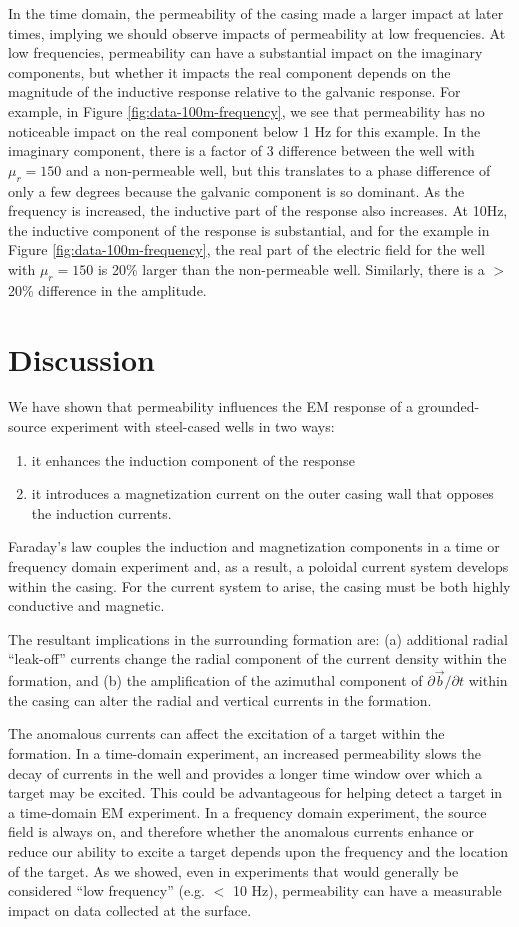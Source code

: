 In the time domain, the permeability of the casing made a larger impact at later times, implying we should observe impacts of permeability at low frequencies. At low frequencies, permeability can have a substantial impact on the imaginary components, but whether it impacts the real component depends on the magnitude of the inductive response relative to the galvanic response. For example, in Figure \ref{fig:data-100m-frequency}, we see that permeability has no noticeable impact on the real component below 1 Hz for this example. In the imaginary component, there is a factor of 3 difference between the well with $\mu_r = 150$ and a non-permeable well, but this translates to a phase difference of only a few degrees because the galvanic component is so dominant. As the frequency is increased, the inductive part of the response also increases. At 10Hz, the inductive component of the response is substantial, and for the example in Figure \ref{fig:data-100m-frequency}, the real part of the electric field for the well with $\mu_r = 150$ is 20\% larger than the non-permeable well. Similarly, there is a $>$20\% difference in the amplitude.


\section{Discussion}
We have shown that permeability influences the EM response of a grounded-source experiment with steel-cased wells in two ways:
\begin{enumerate}
\item it enhances the induction component of the response
\item it introduces a magnetization current on the outer casing wall that opposes the induction currents.
\end{enumerate}
Faraday's law couples the induction and magnetization components in a time or frequency domain experiment and, as a result, a poloidal current system develops within the casing. For the current system to arise, the casing must be both highly conductive and magnetic.

The resultant implications in the surrounding formation are: (a) additional radial ``leak-off'' currents change the radial component of the current density within the formation, and (b) the amplification of the azimuthal component of $\partial \vec{b}/\partial t$ within the casing can alter the radial and vertical currents in the formation.

The anomalous currents can affect the excitation of a target within the formation. In a time-domain experiment, an increased permeability slows the decay of currents in the well and provides a longer time window over which a target may be excited. This could be advantageous for helping detect a target in a time-domain EM experiment. In a frequency domain experiment, the source field is always on, and therefore whether the anomalous currents enhance or reduce our ability to excite a target depends upon the frequency and the location of the target.  As we showed, even in experiments that would generally be considered ``low frequency'' (e.g. $<$ 10 Hz), permeability can have a measurable impact on data collected at the surface.

